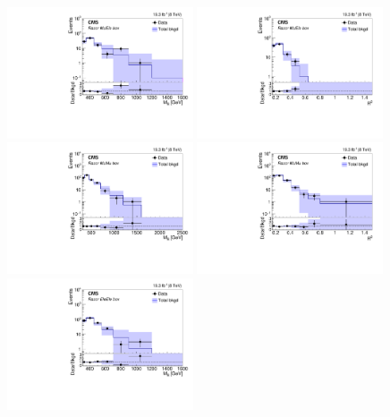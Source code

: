 \begin{figure}[tb!]
\centering
\includegraphics[width=0.49\textwidth]{figs/analysis8TeV/MR_ElectronHad-Run2012ABCD_Sideband_MuEle.pdf}
\includegraphics[width=0.49\textwidth]{figs/analysis8TeV/RSQ_ElectronHad-Run2012ABCD_Sideband_MuEle.pdf}
\includegraphics[width=0.49\textwidth]{figs/analysis8TeV/MR_MuHad-Run2012ABCD_Sideband_MuMu.pdf}
\includegraphics[width=0.49\textwidth]{figs/analysis8TeV/RSQ_MuHad-Run2012ABCD_Sideband_MuMu.pdf}
\includegraphics[width=0.49\textwidth]{figs/analysis8TeV/MR_ElectronHad-Run2012ABCD_Sideband_EleEle.pdf}

\end{figure}
